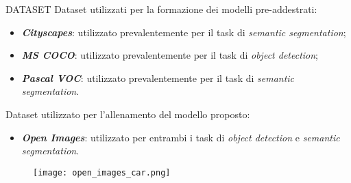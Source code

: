 \begin{frame}{DATASET}
    Dataset utilizzati per la formazione dei modelli pre-addestrati:
    \begin{itemize}
        \item {\bfseries{\emph{Cityscapes}}}: utilizzato prevalentemente per il task di \emph{semantic segmentation};
        \item {\bfseries{\emph{MS COCO}}}: utilizzato prevalentemente per il task di \emph{object detection};
        \item {\bfseries{\emph{Pascal VOC}}}: utilizzato prevalentemente per il task di \emph{semantic segmentation}.
    \end{itemize}
    Dataset utilizzato per l'allenamento del modello proposto:
    \begin{itemize}
        \item {\bfseries{\emph{Open Images}}}: utilizzato per entrambi i task di \emph{object detection} e \emph{semantic segmentation}.
    \end{itemize}
    \begin{figure}
        \texttt{[image: open\_images\_car.png]}
    \end{figure}
\end{frame}